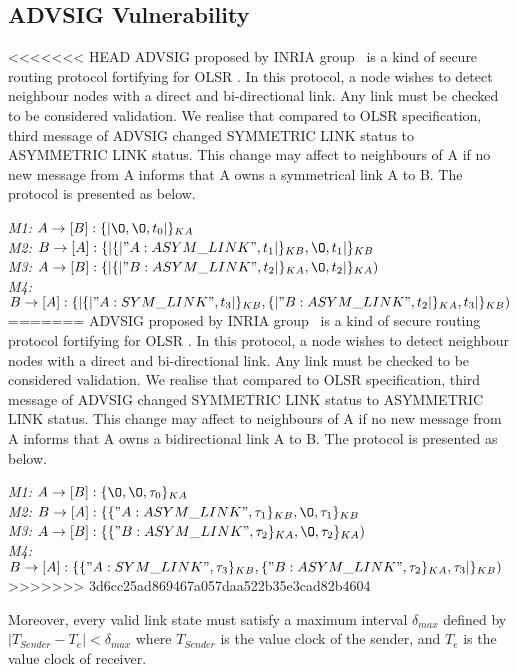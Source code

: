 \subsection{ADVSIG Vulnerability}

<<<<<<< HEAD
ADVSIG proposed by INRIA group~\cite{Raffo:2004:ASS:1029102.1029106} is a kind of secure routing protocol fortifying for OLSR \cite{Clausen:2003:OLS:RFC3626}. In this protocol, a node wishes to detect neighbour nodes with a direct and bi-directional link. Any link must be checked to be considered validation. We realise that compared to OLSR specification, third message of ADVSIG changed SYMMETRIC LINK status to ASYMMETRIC LINK status. This change may affect to neighbours of A if no new message from A informs that A owns a symmetrical link A to B. The protocol is presented as below. 
\begin{flushleft}
 \emph{M1:} $A \to [B]: \{|\O, \O, t_0|\}_{KA}$\\
 \emph{M2:} $B \to [A]: \{|\{|"A:ASYM\_LINK", t_1|\}_{KB}, \O,t_1|\}_{KB}$\\
\emph{M3:} $A \to [B]: \{|\{|"B:ASYM\_LINK",t_2|\}_{KA},\O ,t_2 |\}_{KA})$\\
 \emph{M4:} $B \to [A] : \{|\{|"A:SYM\_LINK", t_3|\}_{KB} ,\{|"B:ASYM\_LINK",t_2|\}_{KA} ,t_3|\}_{KB})$
=======
ADVSIG proposed by INRIA group~\cite{Raffo:2004:ASS:1029102.1029106} is a kind of secure routing protocol fortifying for OLSR \cite{Clausen:2003:OLS:RFC3626}. In this protocol, a node wishes to detect neighbour nodes with a direct and bi-directional link. Any link must be checked to be considered validation. We realise that compared to OLSR specification, third message of ADVSIG changed SYMMETRIC LINK status to ASYMMETRIC LINK status. This change may affect to neighbours of A if no new message from A informs that A owns a bidirectional link A to B. The protocol is presented as below. 
\begin{flushleft}
 \emph{M1:} $A \to [B]: \{\O, \O, \tau_0\}_{KA}$\\
 \emph{M2:} $B \to [A]: \{\{"A:ASYM\_LINK", \tau_1\}_{KB}, \O,\tau_1\}_{KB}$\\
\emph{M3:} $A \to [B]: \{\{"B:ASYM\_LINK",\tau_2\}_{KA},\O ,\tau_2 \}_{KA})$\\
 \emph{M4:} $B \to [A] : \{\{"A:SYM\_LINK", \tau_3\}_{KB} ,\{"B:ASYM\_LINK",\tau_2\}_{KA} ,\tau_3|\}_{KB})$
>>>>>>> 3d6cc25ad869467a057daa522b35e3cad82b4604
\end{flushleft}

Moreover, every valid link state must satisfy a maximum interval $\delta_{max}$ defined by $|T_{Sender} - T_e | < \delta_{max}$ where $T_{Sender}$ is the value clock of the sender, and $T_e$ is the value clock of receiver. 


\end{flushleft}
